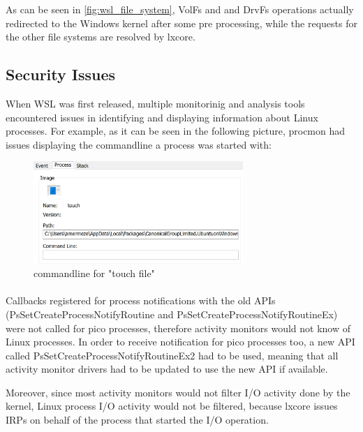             As can be seen in \ref{fig:wsl_file_system}, VolFs and and DrvFs operations actually redirected to the Windows kernel after some
            pre processing, while the requests for the other file systems are resolved by lxcore.
        
        \subsection{Security Issues}
            When WSL was first released, multiple monitorinig and analysis tools encountered issues in identifying and displaying information
            about Linux processes. For example, as it can be seen in the following picture, procmon had issues displaying the commandline a process
            was started with:

            \begin{figure}[!htp]
                \centering
                \includegraphics[width=300px, keepaspectratio]{img/procmon.png}
                \caption{commandline for "touch file"}
                \label{fig:procmon}
            \end{figure}

            \paragraph{}
            Callbacks registered for process notifications with the old APIs (PsSetCreateProcessNotifyRoutine and
            PsSetCreateProcessNotifyRoutineEx) were not called for pico processes, therefore activity monitors would not know of Linux processes.
            In order to receive notification for pico processes too, a new API called PsSetCreateProcessNotifyRoutineEx2 had to be used, meaning
            that all activity monitor drivers had to be updated to use the new API if available.

            Moreover, since most activity monitors would not filter I/O activity done by the kernel, Linux process I/O activity would not be
            filtered, because lxcore issues IRPs on behalf of the process that started the I/O operation.


